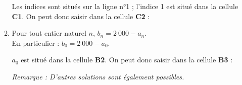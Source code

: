 \begin{corrige}
\begin{enumerate}
\begin{enumerate}[label=\alph*.]
               \par
               Les indices sont situés sur la ligne n°1 ; l'indice 1 est situé dans la cellule \textbf{C1}. On peut donc saisir dans la cellule \textbf{C2} :
               \par
               \begin{center}
               \end{center}
               \item %
               Pour tout entier naturel $n$, $b_n=2~000-a_n$.\\
               En particulier : ${b_0=2~000-a_0}$.
               \par
               $a_0$ est situé dans la cellule \textbf{B2}. On peut donc saisir dans la cellule \textbf{B3} :
               \par
               \begin{center}
               \end{center}
               \par
               \textit{Remarque : D'autres solutions sont également possibles.}
               \par
               \par
          \end{enumerate}
          \par
     \end{enumerate}
\end{corrige}
